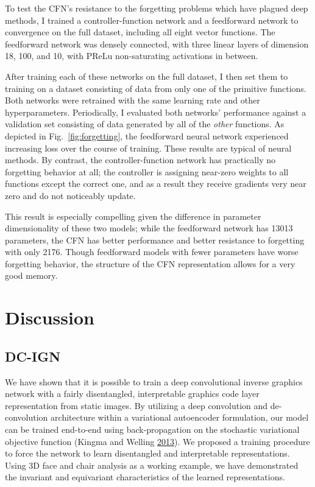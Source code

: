\documentclass[12pt,twoside]{mitthesis}
\begin{document}
To test the CFN's resistance to the forgetting problems which have
plagued deep methods, I trained a controller-function network and a
feedforward network to convergence on the full dataset, including all
eight vector functions. The feedforward network was densely connected,
with three linear layers of dimension 18, 100, and 10, with PReLu
non-saturating activations in between.

After training each of these networks on the full dataset, I then set
them to training on a dataset consisting of data from only one of the
primitive functions. Both networks were retrained with the same learning
rate and other hyperparameters. Periodically, I evaluated both networks'
performance against a validation set consisting of data generated by all
of the \emph{other} functions. As depicted in Fig.~\ref{fig:forgetting},
the feedforward neural network experienced increasing loss over the
course of training. These results are typical of neural methods. By
contrast, the controller-function network has practically no forgetting
behavior at all; the controller is assigning near-zero weights to all
functions except the correct one, and as a result they receive gradients
very near zero and do not noticeably update.

This result is especially compelling given the difference in parameter
dimensionality of these two models; while the feedforward network has
13013 parameters, the CFN has better performance and better resistance
to forgetting with only 2176. Though feedforward models with fewer
parameters have worse forgetting behavior, the structure of the CFN
representation allows for a very good memory.

\chapter{Discussion}\label{discussion}

\section{DC-IGN}\label{dc-ign}

We have shown that it is possible to train a deep convolutional inverse
graphics network with a fairly disentangled, interpretable graphics code
layer representation from static images. By utilizing a deep convolution
and de-convolution architecture within a variational autoencoder
formulation, our model can be trained end-to-end using back-propagation
on the stochastic variational objective function (Kingma and Welling
\protect\hyperlink{ref-kingma2013auto}{2013}). We proposed a training
procedure to force the network to learn disentangled and interpretable
representations. Using 3D face and chair analysis as a working example,
we have demonstrated the invariant and equivariant characteristics of
the learned representations.
\end{document}
